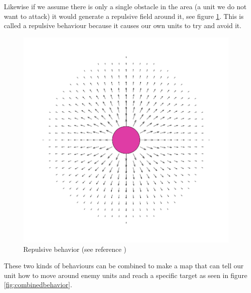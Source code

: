	Likewise if we assume there is only a single obstacle in the area (a unit we do not want to attack) it would generate a repulsive field around it, 
	see figure \ref{fig:avoidbehavior}. This is called a repulsive behaviour because it causes our own units to try and avoid it.

		
	\begin{figure}[H]
		\begin{center}
			\includegraphics[scale=0.3]{Figures/Potentialfields/avoid.png}
			\caption{Repulsive behavior (see reference \cite{pft})}\label{fig:avoidbehavior}
		\end{center}
	\end{figure}
	\pagebreak
	These two kinds of behaviours can be combined to make a map that can tell our unit 
	how to move around enemy units and reach a specific target as seen in figure \ref{fig:combinedbehavior}.
			
